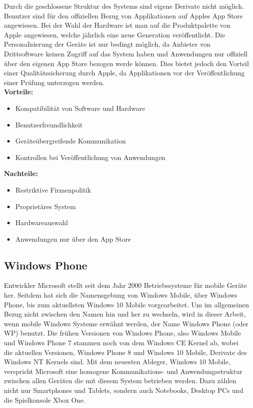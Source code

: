 Durch die geschlossene Struktur des Systems sind eigene Derivate nicht möglich. Benutzer sind für den offiziellen Bezug von Applikationen auf Apples App Store angewiesen.
Bei der Wahl der Hardware ist man auf die Produktpalette von Apple angewiesen, welche jährlich eine neue Generation veröffentlicht. Die Personalisierung der Geräte ist nur bedingt möglich, da Anbieter von Drittsoftware keinen Zugriff auf das System haben und Anwendungen nur offiziell über den eigenen App Store bezogen werde können. Dies bietet jedoch den Vorteil einer Qualitätssicherung durch Apple, da Applikationen vor der Veröffentlichung einer Prüfung unterzogen werden.
\\

\textbf{Vorteile:}
\begin{itemize}
	\item Kompatibilität von Software und Hardware
	\item Benutzerfreundlichkeit
	\item Geräteübergreifende Kommunikation
	\item Kontrollen bei Veröffentlichung von Anwendungen
\end{itemize}

\textbf{Nachteile:}
\begin{itemize}
	\item Restriktive Firmenpolitik
	\item Proprietäres System
	\item Hardwareauswahl
	\item Anwendungen nur über den App Store
\end{itemize}

\subsection{Windows Phone}
Entwickler Microsoft stellt seit dem Jahr 2000 Betriebssysteme für mobile Geräte her. \citep{microsoft_mobile} 
Seitdem hat sich die Namensgebung von Windows Mobile, über Windows Phone, bis zum aktuellsten Windows 10 Mobile vorgearbeitet. Um im allgemeinen Bezug nicht zwischen den Namen hin und her zu wechseln, wird in dieser Arbeit, wenn mobile Windows Systeme erwähnt werden, der Name Windows Phone (oder WP) benutzt.
Die frühen Versionen von Windows Phone, also Windows Mobile und Windows Phone 7 stammen noch von dem Windows CE Kernel ab, wobei die aktuellen Versionen, Windows Phone 8 und Windows 10 Mobile, Derivate des Windows NT Kernels sind. Mit dem neuesten Ableger, Windows 10 Mobile, verspricht Microsoft eine homogene Kommunikations- und Anwendungsstruktur zwischen allen Geräten die mit diesem System betrieben werden. Dazu zählen nicht nur Smartphones und Tablets, sondern auch Notebooks, Desktop PCs und die Spielkonsole Xbox One. \citep{windows10_features}

